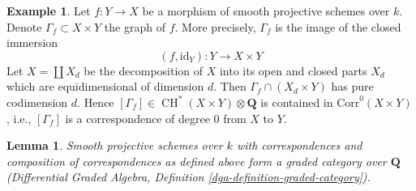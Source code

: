 \documentclass{stacks-project}
\theoremstyle{plain}
\newtheorem{lemma}[subsection]{Lemma}
\theoremstyle{definition}
\newtheorem{example}[subsection]{Example}
\theoremstyle{remark}
\numberwithin{equation}{subsection}
\def\CH{\mathop{\mathrm{CH}}\nolimits}
\begin{document}
\begin{example}
\label{example-graph-correspondence}
Let $f : Y \to X$ be a morphism of smooth projective schemes over $k$.
Denote $\Gamma_f \subset X \times Y$ the graph of $f$. More precisely,
$\Gamma_f$ is the image of the closed immersion
$$
(f, \text{id}_Y) : Y \longrightarrow X \times Y
$$
Let $X = \coprod X_d$ be the decomposition of $X$ into its
open and closed parts $X_d$ which are equidimensional of dimension $d$.
Then $\Gamma_f \cap (X_d \times Y)$ has pure codimension $d$. Hence
$[\Gamma_f] \in \CH^*(X \times Y) \otimes \mathbf{Q}$
is contained in $\text{Corr}^0(X \times Y)$, i.e., $[\Gamma_f]$
is a correspondence of degree $0$ from $X$ to $Y$.
\end{example}

\begin{lemma}
\label{lemma-category-correspondences}
Smooth projective schemes over $k$ with correspondences and composition
of correspondences as defined above form a graded category over
$\mathbf{Q}$
(Differential Graded Algebra, Definition \ref{dga-definition-graded-category}).
\end{lemma}
\end{document}
